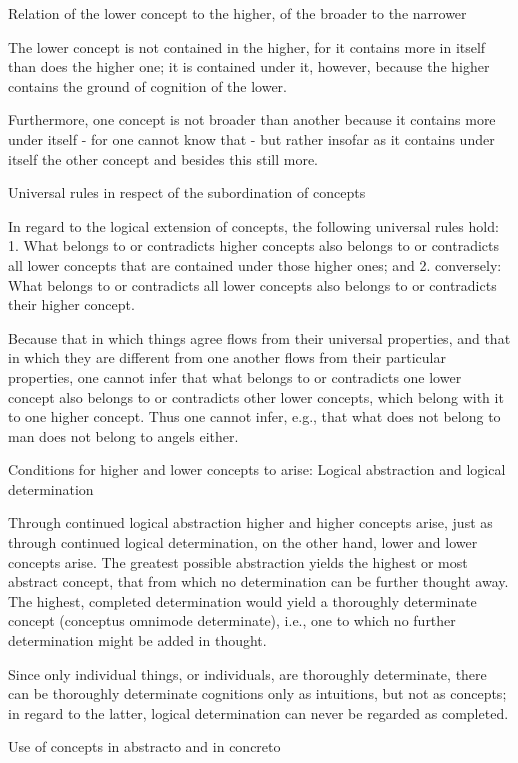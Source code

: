 Relation of the lower concept to the higher, of the broader to the narrower

The lower concept is not contained in the higher,
for it contains more in itself than does the higher one;
it is contained under it, however, because the higher contains
the ground of cognition of the lower.

Furthermore, one concept is not broader than another because it contains
more under itself - for one cannot know that - but rather insofar as it
contains under itself the other concept and besides this still more.

Universal rules in respect of the subordination of concepts

In regard to the logical extension of concepts,
the following universal rules hold:
1. What belongs to or contradicts higher concepts also belongs to or contradicts
all lower concepts that are contained under those higher ones; and
2. conversely: What belongs to or contradicts all lower concepts also belongs to
or contradicts their higher concept.

    Because that in which things agree flows from their universal properties,
    and that in which they are different from one another flows from their
    particular properties, one cannot infer that what belongs to or contradicts
    one lower concept also belongs to or contradicts other lower concepts,
    which belong with it to one higher concept. Thus one cannot infer, e.g.,
    that what does not belong to man does not belong to angels either.

Conditions for higher and lower concepts to arise:
Logical abstraction and logical determination

Through continued logical abstraction higher and higher concepts arise,
just as through continued logical determination, on the other hand,
lower and lower concepts arise.
The greatest possible abstraction yields the highest or most abstract concept,
that from which no determination can be further thought away.
The highest, completed determination would yield
a thoroughly determinate concept (conceptus omnimode determinate),
i.e., one to which no further determination might be added in thought.

    Since only individual things, or individuals, are thoroughly determinate,
    there can be thoroughly determinate cognitions only as intuitions,
    but not as concepts; in regard to the latter, logical determination
    can never be regarded as completed.

Use of concepts in abstracto and in concreto

